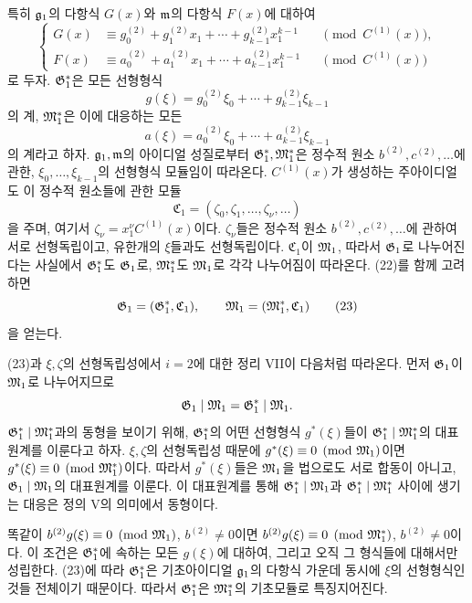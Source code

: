 특히 \(\mathfrak g_1\)의 다항식 \(G(x)\)와 \(\mathfrak m\)의 다항식 \(F(x)\)에 대하여
\begin{equation}
\left\{
\begin{aligned}
G(x)&\equiv g_0^{(2)}+g_1^{(2)}x_1+\cdots+g_{k-1}^{(2)}x_1^{k-1}
&&\pmod{C^{(1)}(x)},\\
F(x)&\equiv a_0^{(2)}+a_1^{(2)}x_1+\cdots+a_{k-1}^{(2)}x_1^{k-1}
&&\pmod{C^{(1)}(x)}
\end{aligned}\right.
\tag{22}
\end{equation}
로 두자. \(\mathfrak G^*_1\)은 모든 선형형식
\[
g(\xi)=g_0^{(2)}\xi_0+\cdots+g_{k-1}^{(2)}\xi_{k-1}
\]
의 계, \(\mathfrak M^*_1\)은 이에 대응하는 모든
\[
a(\xi)=a_0^{(2)}\xi_0+\cdots+a_{k-1}^{(2)}\xi_{k-1}
\]
의 계라고 하자. \(\mathfrak g_1,\mathfrak m\)의 아이디얼 성질로부터 \(\mathfrak G^*_1,\mathfrak M^*_1\)은 정수적 원소 \(b^{(2)},c^{(2)},\ldots\)에 관한, \(\xi_0,\ldots,\xi_{k-1}\)의 선형형식 모듈임이 따라온다. \(C^{(1)}(x)\)가 생성하는 주아이디얼도 이 정수적 원소들에 관한 모듈
\[
\mathfrak C_1=(\zeta_0,\zeta_1,\ldots,\zeta_\nu,\ldots)
\]
을 주며, 여기서 \(\zeta_\nu=x_1^\nu C^{(1)}(x)\)이다. \(\zeta_\nu\)들은 정수적 원소 \(b^{(2)},c^{(2)},\ldots\)에 관하여 서로 선형독립이고, 유한개의 \(\xi\)들과도 선형독립이다. \(\mathfrak C_1\)이 \(\mathfrak M_1\), 따라서 \(\mathfrak G_1\)로 나누어진다는 사실에서 \(\mathfrak G^*_1\)도 \(\mathfrak G_1\)로, \(\mathfrak M^*_1\)도 \(\mathfrak M_1\)로 각각 나누어짐이 따라온다. (22)를 함께 고려하면
\begin{equation}
\mathfrak G_1=(\mathfrak G^*_1,\mathfrak C_1),\qquad
\mathfrak M_1=(\mathfrak M^*_1,\mathfrak C_1)
\tag{23}
\end{equation}
을 얻는다.

(23)과 \(\xi,\zeta\)의 선형독립성에서 \(i=2\)에 대한 정리 VII이 다음처럼 따라온다. 먼저 \(\mathfrak G_1\)이 \(\mathfrak M_1\)로 나누어지므로
\[
\mathfrak G_1\mid\mathfrak M_1=\mathfrak G^*_1\mid\mathfrak M_1.
\]
\(\mathfrak G^*_1\mid\mathfrak M^*_1\)과의 동형을 보이기 위해, \(\mathfrak G^*_1\)의 어떤 선형형식 \(g^*(\xi)\)들이 \(\mathfrak G^*_1\mid\mathfrak M^*_1\)의 대표원계를 이룬다고 하자. \(\xi,\zeta\)의 선형독립성 때문에 \(g^*(\xi)\equiv0\pmod{\mathfrak M_1}\)이면 \(g^*(\xi)\equiv0\pmod{\mathfrak M^*_1}\)이다. 따라서 \(g^*(\xi)\)들은 \(\mathfrak M_1\)을 법으로도 서로 합동이 아니고, \(\mathfrak G_1\mid\mathfrak M_1\)의 대표원계를 이룬다. 이 대표원계를 통해 \(\mathfrak G^*_1\mid\mathfrak M_1\)과 \(\mathfrak G^*_1\mid\mathfrak M^*_1\) 사이에 생기는 대응은 정의 V의 의미에서 동형이다.

똑같이 \(b^{(2)}g(\xi)\equiv0\pmod{\mathfrak M_1}\), \(b^{(2)}\ne0\)이면 \(b^{(2)}g(\xi)\equiv0\pmod{\mathfrak M^*_1}\), \(b^{(2)}\ne0\)이다. 이 조건은 \(\mathfrak G^*_1\)에 속하는 모든 \(g(\xi)\)에 대하여, 그리고 오직 그 형식들에 대해서만 성립한다. (23)에 따라 \(\mathfrak G^*_1\)은 기초아이디얼 \(\mathfrak g_1\)의 다항식 가운데 동시에 \(\xi\)의 선형형식인 것들 전체이기 때문이다. 따라서 \(\mathfrak G^*_1\)은 \(\mathfrak M^*_1\)의 기초모듈로 특징지어진다.


